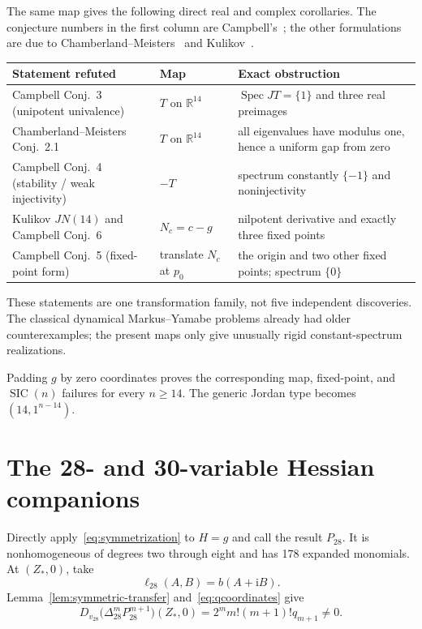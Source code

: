 \documentclass[11pt]{article}
\newcommand{\R}{\mathbb R}
\newcommand{\ii}{\mathrm i}
\newcommand{\SIC}{\operatorname{SIC}}
\begin{document}
The same map gives the following direct real and complex corollaries.  The
conjecture numbers in the first column are Campbell's~\cite{campbell}; the
other formulations are due to Chamberland--Meisters~\cite{chamberland} and
Kulikov~\cite{kulikov}.
\begin{center}
\begin{tabular}{p{}p{}p{}}
\toprule
Statement refuted&Map&Exact obstruction\\
\midrule
Campbell Conj.~3 (unipotent univalence)&$T$ on $\R^{14}$&$\operatorname{Spec}JT=\{1\}$ and three real preimages\\
Chamberland--Meisters Conj.~2.1&$T$ on $\R^{14}$&all eigenvalues have modulus one, hence a uniform gap from zero\\
Campbell Conj.~4 (stability / weak injectivity)&$-T$&spectrum constantly $\{-1\}$ and noninjectivity\\
Kulikov $JN(14)$ and Campbell Conj.~6&$N_c=c-g$&nilpotent derivative and exactly three fixed points\\
Campbell Conj.~5 (fixed-point form)&translate $N_c$ at $p_0$&the origin and two other fixed points; spectrum $\{0\}$\\
\bottomrule
\end{tabular}
\end{center}
These statements are one transformation family, not five independent
discoveries.  The classical dynamical Markus--Yamabe problems already had
older counterexamples; the present maps only give unusually rigid
constant-spectrum realizations.

Padding $g$ by zero coordinates proves the corresponding map, fixed-point,
and $\SIC(n)$ failures for every $n\ge14$.  The generic Jordan type becomes
$(14,1^{n-14})$.

\section{The 28- and 30-variable Hessian companions}

Directly apply~\eqref{eq:symmetrization} to $H=g$ and call the result
$P_{28}$.  It is nonhomogeneous of degrees two through eight and has 178
expanded monomials.  At $(Z_*,0)$, take
\[
 \ell_{28}(A,B)=b(A+\ii B).
\]
Lemma~\ref{lem:symmetric-transfer} and~\eqref{eq:qcoordinates} give
\begin{equation}
 D_{v_{28}}\bigl(\Delta_{28}^mP_{28}^{m+1}\bigr)(Z_*,0)
 =2^m m!(m+1)!q_{m+1}\ne0.
 \label{eq:P28}
\end{equation}
\end{document}
